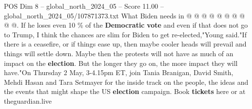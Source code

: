 \begin{textsample}{POS Dim 8 – global\_north\_2024\_05 – Score 11.00 – global\_north\_2024\_05/107871373.txt}
What Biden needs in @ @ @ @ @ @ @ @ @ @.
If he loses even 10 \% of the \textbf{Democratic} \textbf{vote} and even if that does not go to Trump, I think the chances are slim for Biden to get re-elected,"Young said."If there is a ceasefire, or if things ease up, then maybe cooler heads will prevail and things will settle down.
Maybe then the protests will not have as much of an impact on the \textbf{election}.
But the longer they go on, the more impact they will have."On Thursday 2 May, 3-4.15pm ET, join Tania Branigan, David Smith, Mehdi Hasan and Tara Setmayer for the inside track on the people, the ideas and the events that might shape the US \textbf{election} campaign.
Book \textbf{tickets} here or at theguardian.live

\end{textsample}
